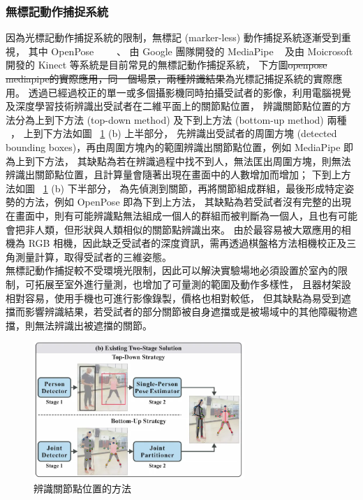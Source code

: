 \subsubsection{無標記動作捕捉系統}
因為光標記動作捕捉系統的限制，無標記 (marker-less) 動作捕捉系統逐漸受到重視，
其中 OpenPose ~\cite{8765346}~\cite{wei2016cpm}~\cite{simon2017hand}~\cite{cao2017realtime}、
由 Google 團隊開發的 MediaPipe ~\cite{mediapipe_web} 及由 Moicrosoft 開發的 Kinect 等系統是目前常見的無標記動作捕捉系統，
下方圖\sout{openpose mediapipe的實際應用，同一個場景，兩種辨識結果}為光標記捕捉系統的實際應用。
透過已經過校正的單一或多個攝影機同時拍攝受試者的影像，利用電腦視覺及深度學習技術辨識出受試者在二維平面上的關節點位置，
辨識關節點位置的方法分為上到下方法 (top-down method) 及下到上方法 (bottom-up method) 兩種 ~\cite{nie2019single}，
上到下方法如圖 ~\ref{ch2_fig_topvsbottom} (b) 上半部分，
先辨識出受試者的周圍方塊 (detected bounding boxes)，再由周圍方塊內的範圍辨識出關節點位置，例如 MediaPipe 即為上到下方法，
其缺點為若在辨識過程中找不到人，無法匡出周圍方塊，則無法辨識出關節點位置，且計算量會隨著出現在畫面中的人數增加而增加；
下到上方法如圖 ~\ref{ch2_fig_topvsbottom} (b) 下半部分，
為先偵測到關節，再將關節組成群組，最後形成特定姿勢的方法，例如 OpenPose 即為下到上方法，
其缺點為若受試者沒有完整的出現在畫面中，則有可能辨識點無法組成一個人的群組而被判斷為一個人，且也有可能會把非人類，但形狀與人類相似的關節點辨識出來。
由於最容易被大眾應用的相機為 RGB 相機，因此缺乏受試者的深度資訊，需再透過棋盤格方法相機校正及三角測量計算，取得受試者的三維姿態。 \\
無標記動作捕捉較不受環境光限制，因此可以解決實驗場地必須設置於室內的限制，可拓展至室外進行量測，也增加了可量測的範圍及動作多樣性，
且器材架設相對容易，使用手機也可進行影像錄製，價格也相對較低，
但其缺點為易受到遮擋而影響辨識結果，若受試者的部分關節被自身遮擋或是被場域中的其他障礙物遮擋，則無法辨識出被遮擋的關節。 \\

\begin{figure}[!ht]
    \centering
    \includegraphics[width=8cm]{figure/ch2_fig_topvsbottom.png}
     \caption[辨識關節點位置的方法 ~\cite{nie2019single}]{辨識關節點位置的方法 ~\cite{nie2019single}}
     \label{ch2_fig_topvsbottom}
 \end{figure}

